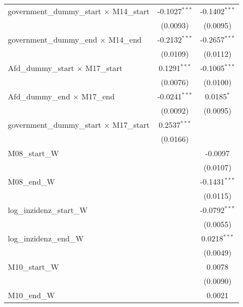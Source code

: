 \documentclass[10pt,a4paper]{article}
\begin{document}
\begin{tabular}{lcc}
   government\_dummy\_start $\times$ M14\_start     & -0.1027$^{***}$ & -0.1402$^{***}$\\   
                                                    & (0.0093)        & (0.0095)\\   
   government\_dummy\_end $\times$ M14\_end         & -0.2132$^{***}$ & -0.2657$^{***}$\\   
                                                    & (0.0109)        & (0.0112)\\   
   Afd\_dummy\_start $\times$ M17\_start            & 0.1291$^{***}$  & -0.1005$^{***}$\\   
                                                    & (0.0076)        & (0.0100)\\   
   Afd\_dummy\_end $\times$ M17\_end                & -0.0241$^{***}$ & 0.0185$^{*}$\\   
                                                    & (0.0092)        & (0.0095)\\   
   government\_dummy\_start $\times$ M17\_start     & 0.2537$^{***}$  &   \\   
                                                    & (0.0166)        &   \\   
   M08\_start\_W                                    &                 & -0.0097\\   
                                                    &                 & (0.0107)\\   
   M08\_end\_W                                      &                 & -0.1431$^{***}$\\   
                                                    &                 & (0.0115)\\   
   log\_inzidenz\_start\_W                          &                 & -0.0792$^{***}$\\   
                                                    &                 & (0.0055)\\   
   log\_inzidenz\_end\_W                            &                 & 0.0218$^{***}$\\   
                                                    &                 & (0.0049)\\   
   M10\_start\_W                                    &                 & 0.0078\\   
                                                    &                 & (0.0090)\\   
   M10\_end\_W                                      &                 & 0.0021\\   

\end{tabular}
\end{document}
